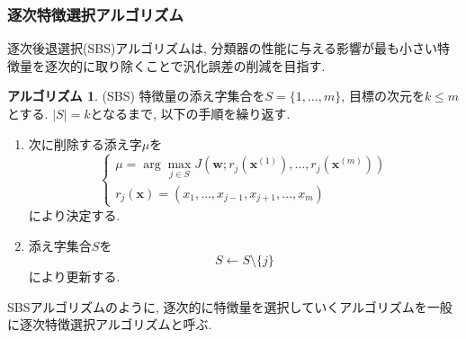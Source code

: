 \documentclass[uplatex]{jsarticle}
\theoremstyle{definition}
\newtheorem{algorithm}[definition]{アルゴリズム}
\numberwithin{equation}{section}
\begin{document}
\subsubsection{逐次特徴選択アルゴリズム}
逐次後退選択(SBS)アルゴリズムは, 分類器の性能に与える影響が最も小さい特徴量を逐次的に取り除くことで汎化誤差の削減を目指す.
\begin{algorithm}
    (SBS)
    特徴量の添え字集合を$S = \{1, \dots, m\}$, 目標の次元を$k \leq m$とする.
    $|S| = k$となるまで, 以下の手順を繰り返す.
    \begin{enumerate}
        \item
        次に削除する添え字$\mu$を
        \begin{equation}
            \left\{
                \begin{aligned}
                    \mu = \arg\max_{j \in S} J(\bm{w}; r_{j}(\bm{x}^{(1)}), \dots, r_{j}(\bm{x}^{(m)})) \\
                    r_{j}(\bm{x}) = (x_{1}, \dots, x_{j - 1}, x_{j + 1}, \dots, x_{m})
                \end{aligned}
            \right.
        \end{equation}
        により決定する.
        \item
        添え字集合$S$を
        \begin{equation}
            S \leftarrow S \setminus \{j\}
        \end{equation}
        により更新する.
    \end{enumerate}
\end{algorithm}

SBSアルゴリズムのように, 逐次的に特徴量を選択していくアルゴリズムを一般に逐次特徴選択アルゴリズムと呼ぶ.
\end{document}

